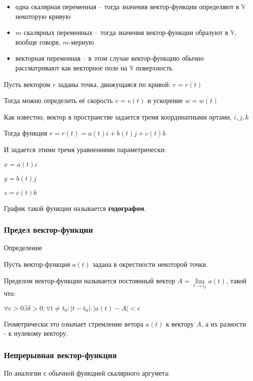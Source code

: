 \begin{itemize}
\item
одна скалярная переменная -- тогда значения вектор-функции определяют в $\mathbb V$ некоторую кривую

\item
$m$ скалярных переменных -- тогда значения вектор-функции образуют в $\mathbb V$, вообще говоря, $m$-мерную

\item
векторная переменная -- в этом случае вектор-функцию обычно рассматривают как векторное поле на $\mathbb V$ поверхность
\end{itemize}

Пусть вектором $ r $ заданы точка, движущаяся по кривой:  $ r = r(t) $

Тогда можно определить её скорость $ v = v(t) $ и ускорение $ w = w(t) $

Как известно, вектор в пространстве задается тремя координатными ортами, $ i,j,k $

Тогда функция $ r = r(t) = a(t)i + b(t)j + c(t)k $

И задается этими тремя уравнениями параметрически:

$ x = a(t)i $

$ y = b(t)j $

$ z = c(t)k $

График такой функции называется \textbf{годографом}.


\subsubsection{Предел вектор-функции}


Определение

Пусть вектор-функция $ a(t) $ задана в окрестности некоторой точки.

Пределом вектор-функции называется постоянный вектор $ A = \lim\limits_{t \to t_{0}}  a(t)$, такой что:

$ \forall \epsilon > 0 \exists \delta > 0 : \forall t \ne t_{0} : |t-t_{0}| : |a(t) - A| < \epsilon $

Геометрически это означает стремление ветора $ a(t) $ к вектору $ A $, а их разности - к нулевому вектору.


\subsubsection{Непрерывная вектор-функция}

По аналогии с обычной функцией скалярного аргумета:

